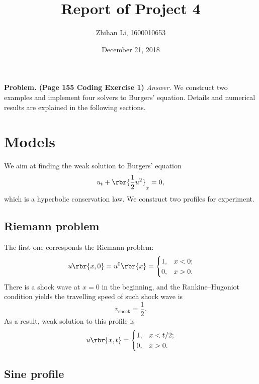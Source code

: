 \documentclass[english, nochinese]{pnote}
\title{Report of Project 4}
\author{Zhihan Li, 1600010653}
\date{December 21, 2018}
\begin{document}
\maketitle

\textbf{Problem. (Page 155 Coding Exercise 1)} \textit{Answer.} We construct two examples and implement four solvers to Burgers' equation. Details and numerical results are explained in the following sections.

\section{Models}

We aim at finding the weak solution to Burgers' equation
\begin{equation}
u_t + \rbr{ \frac{1}{2} u^2 }_x = 0,
\end{equation}
which is a hyperbolic conservation law. We construct two profiles for experiment.

\subsection{Riemann problem}

The first one corresponds the Riemann problem:
\begin{equation}
u \rbr{ x, 0 } = u^0 \rbr{x} =
\begin{cases}
1, & x < 0; \\
0, & x > 0.
\end{cases}
\end{equation}
There is a shock wave at $ x = 0 $ in the beginning, and the Rankine--Hugoniot condition yields the travelling speed of such shock wave is
\begin{equation}
v_{\text{shock}} = \frac{1}{2}.
\end{equation}
As a result, weak solution to this profile is
\begin{equation}
u \rbr{ x, t } =
\begin{cases}
1, & x < t / 2; \\
0, & x > 0.
\end{cases}
\end{equation}

\subsection{Sine profile}
\end{document}
